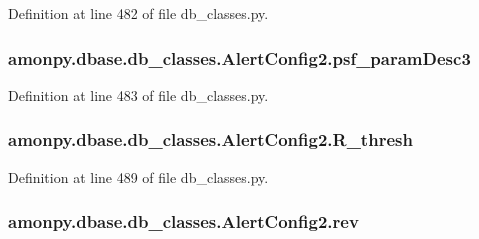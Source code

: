 Definition at line 482 of file db\-\_\-classes.\-py.

\hypertarget{classamonpy_1_1dbase_1_1db__classes_1_1_alert_config2_ab6fedbe0c3c5ddec221dd40f2118c3da}{
\subsubsection[{psf\-\_\-param\-Desc3}]{\setlength{\rightskip}{0pt plus 5cm}amonpy.\-dbase.\-db\-\_\-classes.\-Alert\-Config2.\-psf\-\_\-param\-Desc3}}\label{classamonpy_1_1dbase_1_1db__classes_1_1_alert_config2_ab6fedbe0c3c5ddec221dd40f2118c3da}


Definition at line 483 of file db\-\_\-classes.\-py.

\hypertarget{classamonpy_1_1dbase_1_1db__classes_1_1_alert_config2_a94dabae815e574e6453b65d4efd9c0b0}{
\subsubsection[{R\-\_\-thresh}]{\setlength{\rightskip}{0pt plus 5cm}amonpy.\-dbase.\-db\-\_\-classes.\-Alert\-Config2.\-R\-\_\-thresh}}\label{classamonpy_1_1dbase_1_1db__classes_1_1_alert_config2_a94dabae815e574e6453b65d4efd9c0b0}


Definition at line 489 of file db\-\_\-classes.\-py.

\hypertarget{classamonpy_1_1dbase_1_1db__classes_1_1_alert_config2_a44f00e5625906d6af0bda3a6f99f9c99}{
\subsubsection[{rev}]{\setlength{\rightskip}{0pt plus 5cm}amonpy.\-dbase.\-db\-\_\-classes.\-Alert\-Config2.\-rev}}\label{classamonpy_1_1dbase_1_1db__classes_1_1_alert_config2_a44f00e5625906d6af0bda3a6f99f9c99}


